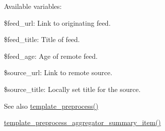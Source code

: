 Available variables:
\begin{DoxyItemize}
\item \$feed\_\-url: Link to originating feed.
\item \$feed\_\-title: Title of feed.
\item \$feed\_\-age: Age of remote feed.
\item \$source\_\-url: Link to remote source.
\item \$source\_\-title: Locally set title for the source.
\end{DoxyItemize}

\begin{DoxySeeAlso}{See also}
\hyperlink{includes_2theme_8inc_a3eeb7bcdba7ef4859f99586da264d347}{template\_\-preprocess()} 

\hyperlink{aggregator_8pages_8inc_ab60386a469193731ad719534bcdcac56}{template\_\-preprocess\_\-aggregator\_\-summary\_\-item()} 
\end{DoxySeeAlso}
